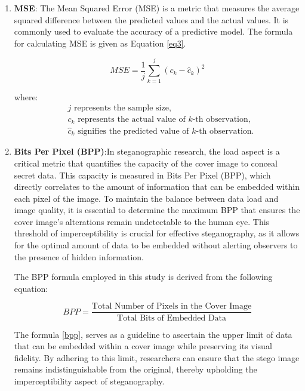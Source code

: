 \documentclass{ieeeaccess}
\begin{document}
\begin{enumerate}
\item \textbf{MSE}: The Mean Squared Error (MSE) is a metric that measures the average squared difference between the predicted values and the actual values\cite{b66}. It is commonly used to evaluate the accuracy of a predictive model. The formula for calculating MSE is given as Equation \ref{eq3}.

\begin{equation}
    MSE = \frac{1}{j} \sum_{k=1}^{j} (c_k - \hat{c}_k)^2
    \label{eq3}
\end{equation}

where:
\begin{align*}
    &j \text{ represents the sample size,} \\
    &c_k \text{ represents the actual value of } k\text{-th observation,} \\
    &\hat{c}_k \text{ signifies the predicted value of } k\text{-th observation.}
\end{align*}


\item \textbf{Bits Per Pixel (BPP)}:In steganographic research, the load aspect is a critical metric that quantifies the capacity of the cover image to conceal secret data. This capacity is measured in Bits Per Pixel (BPP), which directly correlates to the amount of information that can be embedded within each pixel of the image.
To maintain the balance between data load and image quality, it is essential to determine the maximum BPP that ensures the cover image’s alterations remain undetectable to the human eye. This threshold of imperceptibility is crucial for effective steganography, as it allows for the optimal amount of data to be embedded without alerting observers to the presence of hidden information\cite{b74}.

The BPP formula employed in this study is derived from the following equation:

\begin{equation}
BPP = \frac{{\text{Total Number of Pixels in the Cover Image}}}{{\text{Total Bits of Embedded Data}}}
\label{bpp}
\end{equation}

The formula \ref{bpp}, serves as a guideline to ascertain the upper limit of data that can be embedded within a cover image while preserving its visual fidelity. By adhering to this limit, researchers can ensure that the stego image remains indistinguishable from the original, thereby upholding the imperceptibility aspect of steganography.
\end{enumerate}
\end{document}
